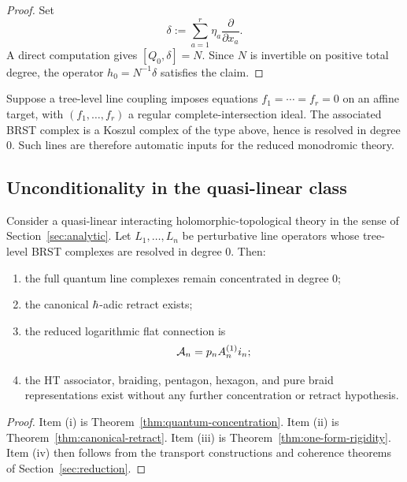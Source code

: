 \begin{proof}
Set
\[
 \delta:=\sum_{a=1}^r \eta_a\frac{\partial}{\partial x_a}.
\]
A direct computation gives $[Q_0,\delta]=N$. Since $N$ is invertible on positive total degree, the operator $h_0=N^{-1}\delta$ satisfies the claim.
\end{proof}

\begin{example}
Suppose a tree-level line coupling imposes equations $f_1=\cdots=f_r=0$ on an affine target, with $(f_1,\dots,f_r)$ a regular complete-intersection ideal. The associated BRST complex is a Koszul complex of the type above, hence is resolved in degree $0$. Such lines are therefore automatic inputs for the reduced monodromic theory.
\end{example}

\subsection{Unconditionality in the quasi-linear class}

\begin{theorem}\label{thm:unconditionality}
Consider a quasi-linear interacting holomorphic-topological theory in the sense of Section~\ref{sec:analytic}. Let $L_1,\dots,L_n$ be perturbative line operators whose tree-level BRST complexes are resolved in degree $0$. Then:
\begin{enumerate}[label=\textup{(\roman*)}]
 \item the full quantum line complexes remain concentrated in degree $0$;
 \item the canonical $\hbar$-adic retract exists;
 \item the reduced logarithmic flat connection is
 \[
 \mathcal A_n = p_nA_n^{(1)}i_n;
 \]
 \item the HT associator, braiding, pentagon, hexagon, and pure braid representations exist without any further concentration or retract hypothesis.
\end{enumerate}
\end{theorem}

\begin{proof}
Item (i) is Theorem~\ref{thm:quantum-concentration}. Item (ii) is Theorem~\ref{thm:canonical-retract}. Item (iii) is Theorem~\ref{thm:one-form-rigidity}. Item (iv) then follows from the transport constructions and coherence theorems of Section~\ref{sec:reduction}.
\end{proof}

